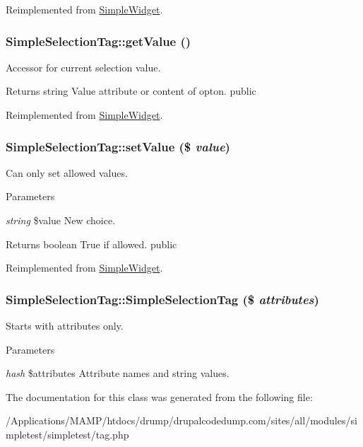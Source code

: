 Reimplemented from \hyperlink{class_simple_widget_a9c0702cdfee1237b1599cb920ce14ba6}{SimpleWidget}.\hypertarget{class_simple_selection_tag_a2eb746b2b426205f78ff4eecf6f335a0}{
\subsubsection[{getValue}]{\setlength{\rightskip}{0pt plus 5cm}SimpleSelectionTag::getValue ()}}
\label{class_simple_selection_tag_a2eb746b2b426205f78ff4eecf6f335a0}
Accessor for current selection value. \begin{DoxyReturn}{Returns}
string Value attribute or content of opton.  public 
\end{DoxyReturn}


Reimplemented from \hyperlink{class_simple_widget_a92328cffb96f6966d6a6a07827e65f6d}{SimpleWidget}.\hypertarget{class_simple_selection_tag_a3cf6ad438463a73871ef02f729a7b25b}{
\subsubsection[{setValue}]{\setlength{\rightskip}{0pt plus 5cm}SimpleSelectionTag::setValue (\$ {\em value})}}
\label{class_simple_selection_tag_a3cf6ad438463a73871ef02f729a7b25b}
Can only set allowed values. 
\begin{DoxyParams}{Parameters}
\item[{\em string}]\$value New choice. \end{DoxyParams}
\begin{DoxyReturn}{Returns}
boolean True if allowed.  public 
\end{DoxyReturn}


Reimplemented from \hyperlink{class_simple_widget_a9e048a450e2d29a601e672deda9fa869}{SimpleWidget}.\hypertarget{class_simple_selection_tag_aa82896cb091f3f88898310e5dcfbf446}{
\subsubsection[{SimpleSelectionTag}]{\setlength{\rightskip}{0pt plus 5cm}SimpleSelectionTag::SimpleSelectionTag (\$ {\em attributes})}}
\label{class_simple_selection_tag_aa82896cb091f3f88898310e5dcfbf446}
Starts with attributes only. 
\begin{DoxyParams}{Parameters}
\item[{\em hash}]\$attributes Attribute names and string values. \end{DoxyParams}


The documentation for this class was generated from the following file:\begin{DoxyCompactItemize}
\item 
/Applications/MAMP/htdocs/drump/drupalcodedump.com/sites/all/modules/simpletest/simpletest/tag.php\end{DoxyCompactItemize}
